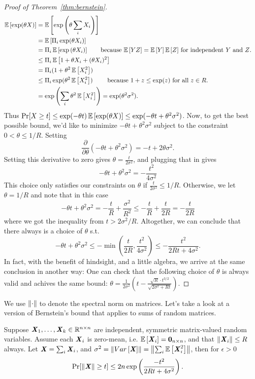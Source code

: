 \begin{proof}[Proof of Theorem~\ref{thm:bernstein}]
\begin{align*}
  \E{\exp(\theta X)}
  &= \E{\exp\left(\theta \sum_i X_i\right)}
  \\
  &=\E{\Pi_{i} \exp(\theta X_i)}
  \\
  &=\Pi_{i} \E{\exp{(\theta X_i)}}
    \tag*{because $\E{YZ} = \E{Y}\E{Z}$ for independent $Y$ and
    $Z$.} %
  \\
  &\leq\Pi_{i} \E{1+\theta X_i+(\theta X_i)^2}
  \\
  &=\Pi_{i} (1+\theta^2\E{ X_i^2})
  \\
  &\leq\Pi_{i} \exp( \theta^2\E{ X_i^2} )
    \tag*{ because $1+z \leq \exp(z)$ for all $z \in R$.}
  \\
  &=\exp\left( \sum_i \theta^2\E{ X_i^2} \right) = \exp(\theta^2 \sigma^2)
    .
\end{align*}
Thus
$\Pr[ X \geq t ] \leq \exp(-\theta t)\mathop{{}\mathbb{E}}\left[\exp(\theta X)\right] \leq
\exp(-\theta t + \theta^2 \sigma^2)$.
Now, to get the best possible bound, we'd like to minimize
$-\theta t + \theta^2 \sigma^2$ subject to the constraint
$0< \theta \leq 1/R$.
Setting
\[ \frac{\partial}{\partial \theta}\left(
    -\theta t + \theta^2
    \sigma^2
  \right)
  = - t + 2 \theta \sigma^2
  .
\]
Setting this derivative to zero gives
$\theta = \frac{t}{2\sigma^2}$,
and plugging that in gives
\[
    -\theta t + \theta^2\sigma^2
    =
    -\frac{t^2}{4\sigma^2}
  \]
This choice only satisfies our constraints on $\theta$ if
$\frac{t}{2\sigma^2} \leq 1/R$.
Otherwise, we let $\theta =  1/R$ and note that in this case
\[
    -\theta t + \theta^2\sigma^2
    =
    -\frac{t}{R} + \frac{\sigma^2}{R^2}
    \leq
    -\frac{t}{R} + \frac{t}{2R}
    =
    -\frac{t}{2R}
  \]
  where we got the inequality from $t > 2\sigma^2/R$.
  Altogether, we can conclude that there always is a choice of
  $\theta$ s.t.
  \[
    -\theta t + \theta^2\sigma^2
    \leq
    - \min\left( \frac{t}{2R} , \frac{t^2}{4\sigma^2} \right)
    \leq
    - \frac{t^2}{2Rt + 4\sigma^2}
    .
  \]
  In fact, with the benefit of hindsight, and a little algebra, we
  arrive at the same conclusion in another way:
  One
  can check that the
  following choice of $\theta$ is always valid and achives the same
  bound:
  $\theta = \frac{1}{2
    \sigma^2}\left( t - \frac{\sqrt{R} \cdot t^{3/2}}{\sqrt{2\sigma^2 + R
        t}} \right)$.
\end{proof}
We use $\left\| \cdot \right\|$ to denote the spectral norm on matrices.
Let's take a look at a version of Bernstein's bound that applies to
sums of random matrices.
\begin{theorem}
  \label{thm:matbernstein}
  Suppose $\boldsymbol{\mathit{X}}_1, \ldots, \boldsymbol{\mathit{X}}_k \in \mathbb{R}^{n \times n}$ are independent,
  symmetric matrix-valued
  random variables.
Assume each $\boldsymbol{\mathit{X}}_i$ is zero-mean, i.e. $\mathop{{}\mathbb{E}}\left[\boldsymbol{\mathit{X}}_i\right] = \boldsymbol{0}_{n \times
  n}$, and that $\left\| \boldsymbol{\mathit{X}}_i \right\| \leq R$ always.
Let $\boldsymbol{\mathit{X}} = \sum_i \boldsymbol{\mathit{X}}_i$, and $\sigma^2 = \left\| \mathop{{}Var}\left[\boldsymbol{\mathit{X}}\right] \right\| = \left\| \sum_i \mathop{{}\mathbb{E}}\left[\boldsymbol{\mathit{X}}_i^2\right] \right\|$,
then for $\epsilon > 0$
\[
\Pr[ \left\| \boldsymbol{\mathit{X}} \right\| \geq t] \leq 2n\exp\left(\frac{-t^2}{2Rt + 4\sigma^2}\right)
.
\]
\end{theorem}
